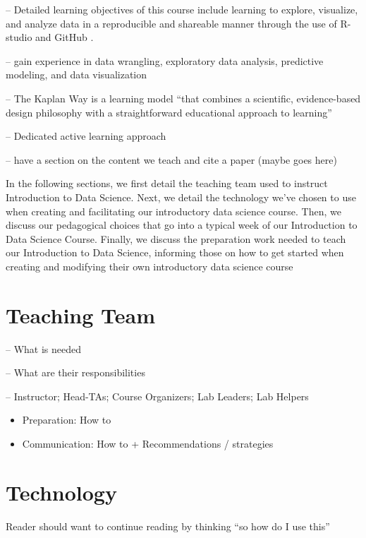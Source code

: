 \documentclass[
  12pt]{article}
\begin{document}
-- Detailed learning objectives of this course include learning to
explore, visualize, and analyze data in a reproducible and shareable
manner through the use of R-studio and GitHub \citep{R21, github}.

-- gain experience in data wrangling, exploratory data analysis,
predictive modeling, and data visualization

-- The Kaplan Way is a learning model ``that combines a scientific,
evidence-based design philosophy with a straightforward educational
approach to learning'' \citep{schweser_2023}

-- Dedicated active learning approach

-- have a section on the content we teach and cite a paper (maybe goes
here)

In the following sections, we first detail the teaching team used to
instruct Introduction to Data Science. Next, we detail the technology
we've chosen to use when creating and facilitating our introductory data
science course. Then, we discuss our pedagogical choices that go into a
typical week of our Introduction to Data Science Course. Finally, we
discuss the preparation work needed to teach our Introduction to Data
Science, informing those on how to get started when creating and
modifying their own introductory data science course

\hypertarget{teaching-team}{%
\section{Teaching Team}\label{teaching-team}}

-- What is needed

-- What are their responsibilities

-- Instructor; Head-TAs; Course Organizers; Lab Leaders; Lab Helpers

\begin{itemize}
\item
  Preparation: How to
\item
  Communication: How to + Recommendations / strategies
\end{itemize}

\hypertarget{sec-tech}{%
\section{Technology}\label{sec-tech}}

Reader should want to continue reading by thinking ``so how do I use
this''
\end{document}
